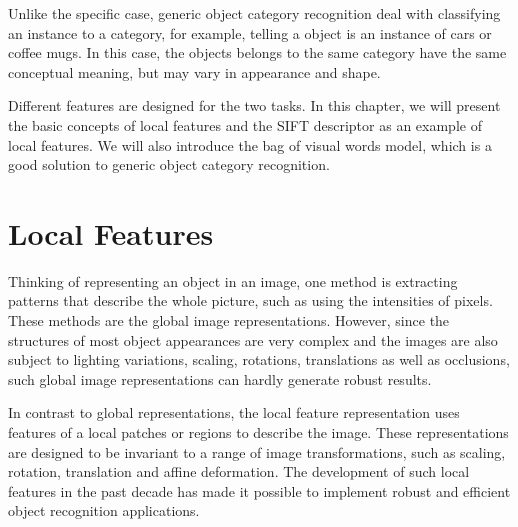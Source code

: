 \documentclass[12pt,final,twoside]{report}
\theoremstyle{plain}
\theoremstyle{definition}
\theoremstyle{remark}
\begin{document}

Unlike the specific case, generic object category recognition deal with classifying an instance to a category, for example, telling a object is an instance of cars or coffee mugs. In this case, the objects belongs to the same category have the same conceptual meaning, but may vary in appearance and shape.

Different features are designed for the two tasks. In this chapter, we will present the basic concepts of local features and the SIFT descriptor as an example of local features. We will also introduce the bag of visual words model, which is a good solution to generic object category recognition.
\fi



\section{Local Features}
Thinking of representing an object in an image, one method is extracting patterns that describe the whole picture, such as using the intensities of pixels. These methods are the global image representations. However, since the structures of most object appearances are very complex and the images are also subject to lighting variations, scaling, rotations, translations as well as occlusions, such global image representations can hardly generate robust results. 

In contrast to global representations, the local feature representation uses features of a local patches or regions to describe the image. These representations are designed to be invariant to a range of image transformations, such as scaling, rotation, translation and affine deformation. The development of such local features in the past decade has made it possible to implement robust and efficient object recognition applications.
\end{document}
